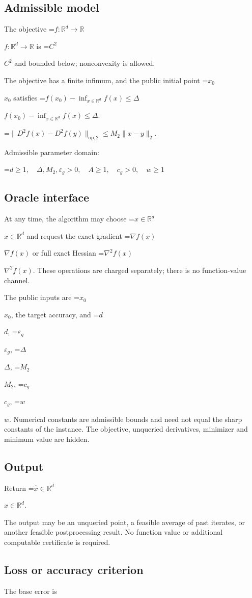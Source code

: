 \documentclass[10pt,a4paper]{article}
\newcommand{\AtlasMath}[1]{\par\begingroup\centering\setbox0=\hbox{$\displaystyle #1$}\ifdim\wd0>1.4\linewidth\typeout{ATLAS WIDE FORMULA: \the\wd0}\fi\ifdim\wd0>\linewidth\resizebox{\linewidth}{!}{\box0}\else\box0\fi\par\endgroup}
\newcommand{\AtlasInlineMath}[1]{\begingroup\setbox0=\hbox{$#1$}\ifdim\wd0>.4\linewidth\endgroup\AtlasMath{#1}\else\endgroup$#1$\fi}
\begin{document}
\subsection{Admissible model}
The objective \AtlasInlineMath{f:\mathbb{R}^d\to\mathbb{R}} is \AtlasInlineMath{C^2} and bounded below; nonconvexity is allowed.

The objective has a finite infimum, and the public initial point \AtlasInlineMath{x_0} satisfies \AtlasInlineMath{f(x_0)-\inf_{x\in \mathbb{R}^d}f(x)\le\Delta}.


\AtlasMath{\|D^{2}f(x)-D^{2}f(y)\|_{\mathrm{op},2}\le M_2\|x-y\|_{2}.}


Admissible parameter domain:


\AtlasMath{d\ge1,\quad\Delta,M_2,\varepsilon_g>0,\quad A\ge1,\quad c_g>0,\quad w\ge1}


\subsection{Oracle interface}
At any time, the algorithm may choose \AtlasInlineMath{x\in\mathbb{R}^d} and request the exact gradient \AtlasInlineMath{\nabla f(x)} or full exact Hessian \AtlasInlineMath{\nabla^2f(x)}. These operations are charged separately; there is no function-value channel.

The public inputs are \AtlasInlineMath{x_0}, the target accuracy, and \AtlasInlineMath{d}, \AtlasInlineMath{\varepsilon_g}, \AtlasInlineMath{\Delta}, \AtlasInlineMath{M_2}, \AtlasInlineMath{c_g}, \AtlasInlineMath{w}. Numerical constants are admissible bounds and need not equal the sharp constants of the instance. The objective, unqueried derivatives, minimizer and minimum value are hidden.

\subsection{Output}
Return \AtlasInlineMath{\widehat{x}\in \mathbb{R}^d}.

The output may be an unqueried point, a feasible average of past iterates, or another feasible postprocessing result. No function value or additional computable certificate is required.

\subsection{Loss or accuracy criterion}
The base error is
\end{document}
